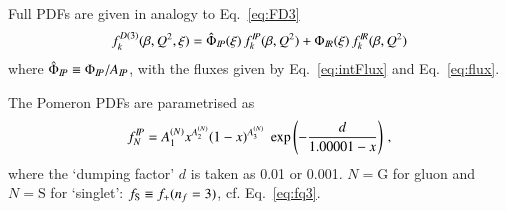 Full PDFs are given in analogy to Eq.~\ref{eq:FD3}
\begin{equation}
f_k^{D(3)}(\beta,Q^2,\xi) =
\hat\Phi_{I\!P}(\xi)\, f^{I\!P}_k(\beta,Q^2)
+
\Phi_{I\!R}(\xi)\, f^{I\!R}_k(\beta,Q^2)
\end{equation}
where $\hat\Phi_{I\!P} \equiv \Phi_{I\!P}/A_{I\!P}$,
with the fluxes given by Eq.~\ref{eq:intFlux} and Eq.~\ref{eq:flux}.

The Pomeron PDFs are parametrised as
\def\Cini#1#2{A^{(#1)}_#2}
\begin{equation}
\label{eq:fP0}
f^\Pom_N = \Cini N1  x^{\Cini N2} (1-x)^{\Cini N3}
  \; \exp\left(-\frac{d}{1.00001-x}\right)
\,,
\end{equation}
where the `dumping factor' $d$ is taken as 0.01 or 0.001.
$N = \mathrm G$ for gluon and $N = \mathrm S$ for `singlet': $f_{\rm S} \equiv f_+(n_f=3)$,
cf. Eq.~\ref{eq:fq3}.










